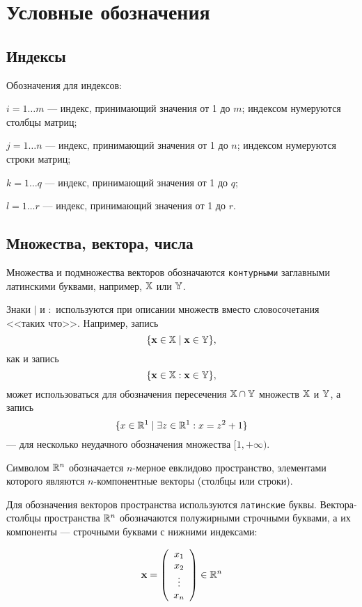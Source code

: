 \chapter{Условные обозначения}

\section*{Индексы}
Обозначения для индексов:

$i=1 \ldots m$ --- индекс, принимающий значения от 1 до $m$; индексом нумеруются столбцы
 матриц;

$j=1 \ldots n$ --- индекс, принимающий значения от 1 до $n$; индексом нумеруются строки
 матриц;

$k=1 \ldots q$ --- индекс, принимающий значения от 1 до $q$;

$l=1 \ldots r$ --- индекс, принимающий значения от 1 до $r$.

\section*{Множества, вектора, числа}

Множества и подмножества векторов обозначаются \texttt{контурными}
заглавными латинскими буквами, например, $\mathbb{X}$ или $\mathbb{Y}$.

    Знаки $\mid$ и $:$ используются при описании множеств вместо словосочетания <<таких что>>.
    Например, запись
\[
    \{\mathbf{x}\in \mathbb{X} \mid \mathbf{x}\in \mathbb{Y}\},
\]
    как и запись
\[
    \{\mathbf{x}\in \mathbb{X} : \mathbf{x}\in \mathbb{Y}\},
\]
    может использоваться для обозначения пересечения $\mathbb{X}\cap\mathbb{Y}$ множеств $\mathbb{X}$ и
    $\mathbb{Y}$, а запись
\[
    \{x\in\mathbb{R}^{1} \mid \exists z\in\mathbb{R}^{1} : x=z^{2}+1\}
\]
    --- для несколько неудачного обозначения  множества $[1,+\infty)$.

Символом $\mathbb{R}^n$ обозначается $n$-мерное евклидово пространство, элементами которого являются
$n$-компонентные векторы (столбцы или строки).

Для обозначения векторов пространства используются
\texttt{латинские} буквы. Вектора-столбцы пространства $\mathbb{R}^n$
обозначаются полужирными строчными буквами, а их компоненты ---
строчными буквами с нижними индексами:

\[
\vc{x} = \left( {\begin{array}{*{20}c}
   {x_1 }  \\
   {x_2 }  \\
    \vdots   \\
   {x_n }  \\
\end{array}} \right) \in \R^n
\]

